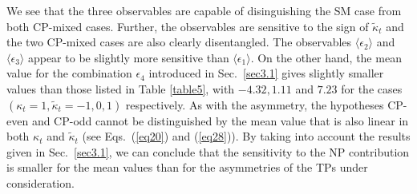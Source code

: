 \documentclass[aps,preprint,tightenlines,floatfix,superscriptaddress,nofootinbib,showpacs]{revtex4-1}
\def\kp{\kappa_t}
\def\kpt{\tilde{\kappa}_t}
\begin{document}
We see that the three observables are capable of disinguishing the SM
case from both $\mathrm{CP}$-mixed cases. Further, the observables are
sensitive to the sign of $\kpt$ and the two $\mathrm{CP}$-mixed cases
are also clearly disentangled. The observables $\langle \epsilon_2
\rangle$ and $\langle \epsilon_3 \rangle$ appear to be slightly more
sensitive than $\langle \epsilon_1 \rangle$. On the other hand, the
mean value for the combination $\epsilon_4$ introduced in
Sec.~\ref{sec3.1} gives slightly smaller values than those listed in
Table \ref{table5}, with $-4.32, 1.11$ and $7.23$ for the cases
$(\kp=1,\kpt=-1,0,1)$ respectively. As with the asymmetry, the
hypotheses $\mathrm{CP}$-even and $\mathrm{CP}$-odd cannot be
distinguished by the mean value that is also linear in both $\kp$ and
$\kpt$ (see Eqs.~(\ref{eq20}) and (\ref{eq28})). By taking into
account the results given in Sec.~\ref{sec3.1}, we can conclude that
the sensitivity to the NP contribution is smaller for the mean values
than for the asymmetries of the TPs under consideration.
\end{document}
